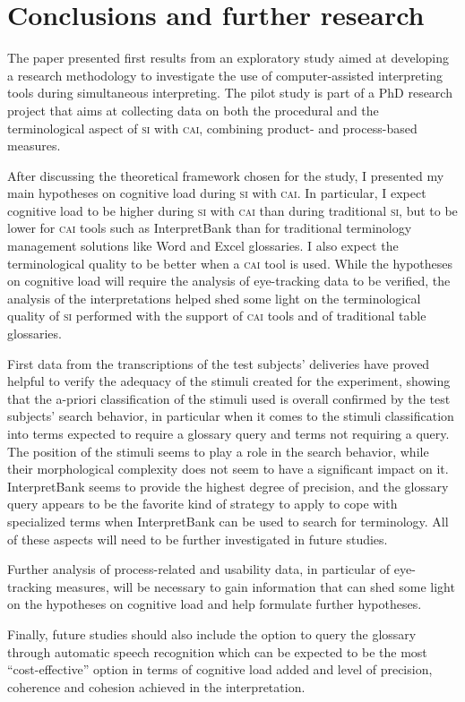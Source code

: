 \documentclass[output=paper]{langsci/langscibook}
\begin{document}
\section{Conclusions and further research}\label{sec:prandi:6}
The paper presented first results from an exploratory study aimed at developing a research methodology to investigate the use of computer-assisted interpreting tools during simultaneous interpreting. The pilot study is part of a PhD research project that aims at collecting data on both the procedural and the terminological aspect of \textsc{si} with \textsc{cai}, combining product- and process-based measures. 

After discussing the theoretical framework chosen for the study, I presented my main hypotheses on cognitive load during \textsc{si} with \textsc{cai}. In particular, I expect cognitive load to be higher during \textsc{si} with \textsc{cai} than during traditional \textsc{si}, but to be lower for \textsc{cai} tools such as InterpretBank than for traditional terminology management solutions like Word and Excel glossaries. I also expect the terminological quality to be better when a \textsc{cai} tool is used. While the hypotheses on cognitive load will require the analysis of eye-tracking data to be verified, the analysis of the interpretations helped shed some light on the terminological quality of \textsc{si} performed with the support of \textsc{cai} tools and of traditional table glossaries. 

First data from the transcriptions of the test subjects’ deliveries have proved helpful to verify the adequacy of the stimuli created for the experiment, showing that the a-priori classification of the stimuli used is overall confirmed by the test subjects’ search behavior, in particular when it comes to the stimuli classification into terms expected to require a glossary query and terms not requiring a query. The position of the stimuli seems to play a role in the search behavior, while their morphological complexity does not seem to have a significant impact on it. InterpretBank seems to provide the highest degree of precision, and the glossary query appears to be the favorite kind of strategy to apply to cope with specialized terms when InterpretBank can be used to search for terminology. All of these aspects will need to be further investigated in future studies.

Further analysis of process-related and usability data, in particular of eye-tracking measures, will be necessary to gain information that can shed some light on the hypotheses on cognitive load and help formulate further hypotheses.

Finally, future studies should also include the option to query the glossary through automatic speech recognition which can be expected to be the most ``cost-effective'' option in terms of cognitive load added and level of precision, coherence and cohesion achieved in the interpretation. 
\sloppy
\printbibliography[heading=subbibliography,notkeyword=this] 
\end{document}
